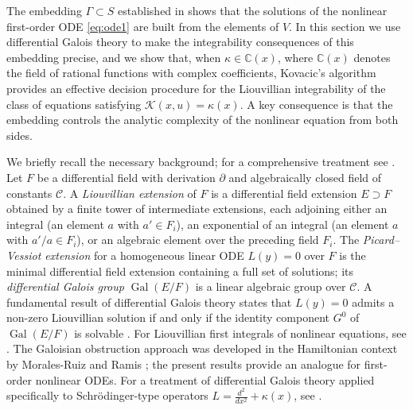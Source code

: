 \documentclass[preprint,a4paper]{elsarticle}
\begin{document}
The embedding $\Gamma\subset S$ established in  shows that the solutions of the nonlinear first-order ODE \eqref{eq:ode1} are built from the elements of $V$. In this section we use differential Galois theory to make the integrability consequences of this embedding precise, and we show that, when $\kappa\in\mathbb{C}(x)$, where $\mathbb{C}(x)$ denotes the field of rational functions with complex coefficients, Kovacic's algorithm \cite{Kovacic1986} provides an effective decision procedure for the Liouvillian integrability of the class of equations satisfying $\mathcal{K}(x,u)=\kappa(x)$. A key consequence is that the embedding controls the analytic complexity of the nonlinear equation from both sides.





We briefly recall the necessary background; for a comprehensive treatment see \cite{vanderPutSinger2003}. Let $F$ be a differential field with derivation $\partial$ and algebraically closed field of constants $\mathcal{C}$. A \emph{Liouvillian extension} of $F$ is a differential field extension $E\supset F$ obtained by a finite tower of intermediate extensions, each adjoining either an integral (an element $a$ with $a'\in F_i$), an exponential of an integral (an element $a$ with $a'/a\in F_i$), or an algebraic element over the preceding field $F_i$. The \emph{Picard--Vessiot extension} for a homogeneous linear ODE $L(y)=0$ over $F$ is the minimal differential field extension containing a full set of solutions; its \emph{differential Galois group} $\operatorname{Gal}(E/F)$ is a linear algebraic group over $\mathcal{C}$. A fundamental result of differential Galois theory states that $L(y)=0$ admits a non-zero Liouvillian solution if and only if the identity component $G^0$ of $\operatorname{Gal}(E/F)$ is solvable \cite{vanderPutSinger2003}. For Liouvillian first integrals of nonlinear equations, see \cite{Singer1992}. The Galoisian obstruction approach was developed in the Hamiltonian context by Morales-Ruiz and Ramis \cite{MoralesRuizRamis2001}; the present results provide an analogue for first-order nonlinear ODEs. For a treatment of differential Galois theory applied specifically to Schr\"odinger-type operators $L = \frac{d^2}{dx^2} + \kappa(x)$, see \cite{AcostaHumanez2011}.
\end{document}
